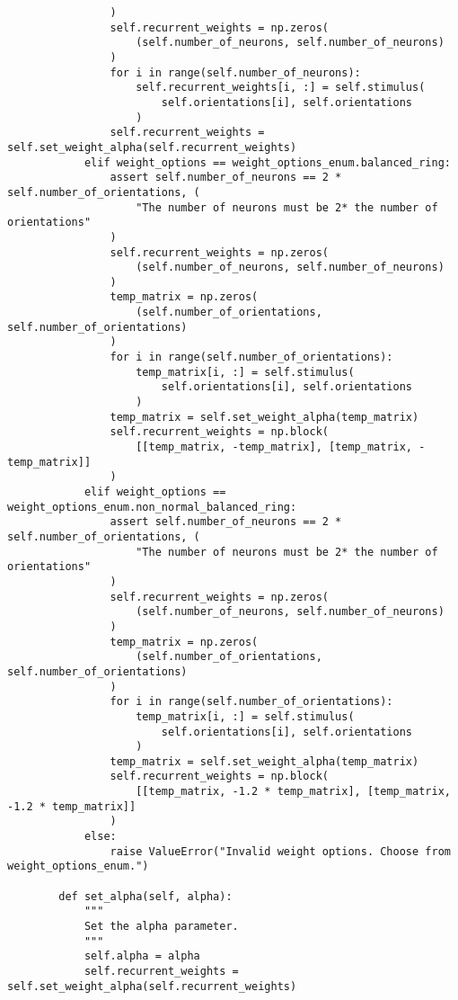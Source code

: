 \documentclass[a4paper, 11pt, oneside]{report}
\begin{document}
\begin{verbatim}
                )
                self.recurrent_weights = np.zeros(
                    (self.number_of_neurons, self.number_of_neurons)
                )
                for i in range(self.number_of_neurons):
                    self.recurrent_weights[i, :] = self.stimulus(
                        self.orientations[i], self.orientations
                    )
                self.recurrent_weights = self.set_weight_alpha(self.recurrent_weights)
            elif weight_options == weight_options_enum.balanced_ring:
                assert self.number_of_neurons == 2 * self.number_of_orientations, (
                    "The number of neurons must be 2* the number of orientations"
                )
                self.recurrent_weights = np.zeros(
                    (self.number_of_neurons, self.number_of_neurons)
                )
                temp_matrix = np.zeros(
                    (self.number_of_orientations, self.number_of_orientations)
                )
                for i in range(self.number_of_orientations):
                    temp_matrix[i, :] = self.stimulus(
                        self.orientations[i], self.orientations
                    )
                temp_matrix = self.set_weight_alpha(temp_matrix)
                self.recurrent_weights = np.block(
                    [[temp_matrix, -temp_matrix], [temp_matrix, -temp_matrix]]
                )
            elif weight_options == weight_options_enum.non_normal_balanced_ring:
                assert self.number_of_neurons == 2 * self.number_of_orientations, (
                    "The number of neurons must be 2* the number of orientations"
                )
                self.recurrent_weights = np.zeros(
                    (self.number_of_neurons, self.number_of_neurons)
                )
                temp_matrix = np.zeros(
                    (self.number_of_orientations, self.number_of_orientations)
                )
                for i in range(self.number_of_orientations):
                    temp_matrix[i, :] = self.stimulus(
                        self.orientations[i], self.orientations
                    )
                temp_matrix = self.set_weight_alpha(temp_matrix)
                self.recurrent_weights = np.block(
                    [[temp_matrix, -1.2 * temp_matrix], [temp_matrix, -1.2 * temp_matrix]]
                )
            else:
                raise ValueError("Invalid weight options. Choose from weight_options_enum.")
    
        def set_alpha(self, alpha):
            """
            Set the alpha parameter.
            """
            self.alpha = alpha
            self.recurrent_weights = self.set_weight_alpha(self.recurrent_weights)
    

\end{verbatim}
\end{document}
